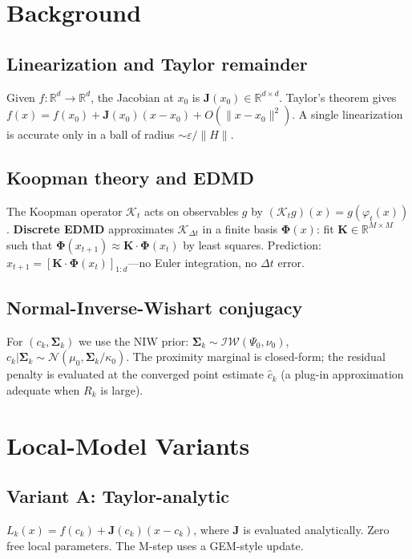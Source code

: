 \documentclass[11pt]{article}
\theoremstyle{definition}
\newcommand{\R}{\mathbb{R}}
\newcommand{\Sv}{\boldsymbol{\Sigma}}
\newcommand{\Phiv}{\boldsymbol{\Phi}}
\newcommand{\Jv}{\boldsymbol{J}}
\newcommand{\Kv}{\boldsymbol{K}}
\begin{document}
\section{Background}

\subsection{Linearization and Taylor remainder}

Given $f\colon\R^d\to\R^d$, the Jacobian at $x_0$ is $\Jv(x_0)\in\R^{d\times d}$. Taylor's theorem gives $f(x) = f(x_0)+\Jv(x_0)(x-x_0)+O(\|x-x_0\|^2)$. A single linearization is accurate only in a ball of radius $\sim\varepsilon/\|H\|$.

\subsection{Koopman theory and EDMD}

The Koopman operator $\mathcal{K}_t$ acts on observables $g$ by $(\mathcal{K}_t g)(x)=g(\varphi_t(x))$. \textbf{Discrete EDMD} approximates $\mathcal{K}_{\Delta t}$ in a finite basis $\Phiv(x)$: fit $\Kv\in\R^{M\times M}$ such that $\Phiv(x_{t+1})\approx\Kv\cdot\Phiv(x_t)$ by least squares. Prediction: $x_{t+1}=[\Kv\cdot\Phiv(x_t)]_{1:d}$---no Euler integration, no $\Delta t$ error.

\subsection{Normal-Inverse-Wishart conjugacy}

For $(c_k,\Sv_k)$ we use the NIW prior: $\Sv_k\sim\mathcal{IW}(\Psi_0,\nu_0)$, $c_k|\Sv_k\sim\mathcal{N}(\mu_0,\Sv_k/\kappa_0)$. The proximity marginal is closed-form; the residual penalty is evaluated at the converged point estimate $\hat{c}_k$ (a plug-in approximation adequate when $R_k$ is large).

\section{Local-Model Variants}

\subsection{Variant A: Taylor-analytic}

$L_k(x)=f(c_k)+\Jv(c_k)(x-c_k)$, where $\Jv$ is evaluated analytically. Zero free local parameters. The M-step uses a GEM-style update.
\end{document}
